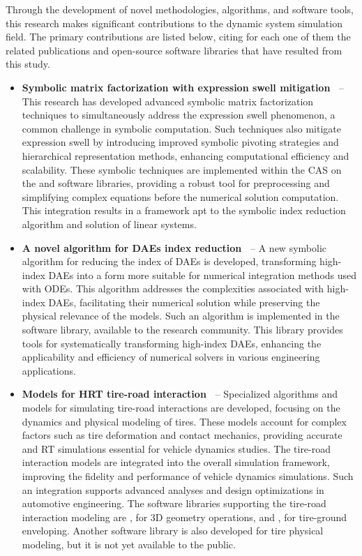 Through the development of novel methodologies, algorithms, and software tools, this research makes significant contributions to the dynamic system simulation field. The primary contributions are listed below, citing for each one of them the related publications and open-source software libraries that have resulted from this study.
%
\begin{itemize}
  \setlength\itemsep{0.0em}
  \item \textbf{Symbolic matrix factorization with expression swell mitigation~\cite{lem, last}} -- This research has developed advanced symbolic matrix factorization techniques to simultaneously address the expression swell phenomenon, a common challenge in symbolic computation. Such techniques also mitigate expression swell by introducing improved symbolic pivoting strategies and hierarchical representation methods, enhancing computational efficiency and scalability. These symbolic techniques are implemented within the \Maple{} \ac{CAS} on the \LEM{} and \LAST{} software libraries, providing a robust tool for preprocessing and simplifying complex equations before the numerical solution computation. This integration results in a framework apt to the symbolic index reduction algorithm and solution of linear systems.
  \item \textbf{A novel algorithm for \acp{DAE} index reduction~\cite{indigo, stocco2024symbolic, stocco2024matrix}} -- A new symbolic algorithm for reducing the index of \acp{DAE} is developed, transforming high-index \acp{DAE} into a form more suitable for numerical integration methods used with \acp{ODE}. This algorithm addresses the complexities associated with high-index \acp{DAE}, facilitating their numerical solution while preserving the physical relevance of the models. Such an algorithm is implemented in the \Indigo{} software library, available to the research community. This library provides tools for systematically transforming high-index \acp{DAE}, enhancing the applicability and efficiency of numerical solvers in various engineering applications.
  \item \textbf{Models for \ac{HRT} tire-road interaction~\cite{acme, enve, stocco2021acme, stocco2024novel}} -- Specialized algorithms and models for simulating tire-road interactions are developed, focusing on the dynamics and physical modeling of tires. These models account for complex factors such as tire deformation and contact mechanics, providing accurate and \ac{RT} simulations essential for vehicle dynamics studies. The tire-road interaction models are integrated into the overall simulation framework, improving the fidelity and performance of vehicle dynamics simulations. Such an integration supports advanced analyses and design optimizations in automotive engineering. The software libraries supporting the tire-road interaction modeling are \Acme{}, for 3D geometry operations, and \Enve{}, for tire-ground enveloping. Another software library is also developed for tire physical modeling, but it is not yet available to the public.

\end{itemize}
